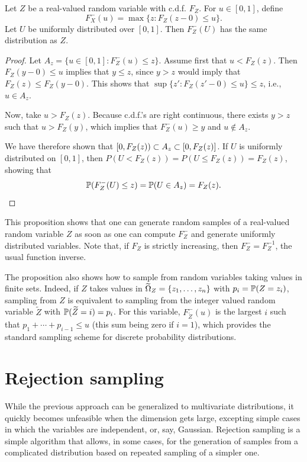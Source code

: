 \begin{proposition}
\label{prop:sampling}
Let $Z$ be a real-valued random variable with c.d.f. $F_Z$.
For  $u\in [0,1]$, define
\[
F_X^-(u) = \max\{z: F_Z(z-0) \leq u\}.
\]
Let $U$ be uniformly distributed over $[0,1]$. Then $F_Z^-(U)$ has the same distribution as $Z$.
\end{proposition}
\begin{proof}
Let $A_z = \{u\in [0,1]: F_Z^-(u) \leq z\}$.  
Assume first that $u<F_Z(z)$. Then $F_Z(y-0) \leq u$ implies that $y\leq z$, since $y>z$ would imply that $F_Z(z) \leq F_Z(y-0)$. This shows that $\sup\{z': F_Z(z'-0) \leq u\} \leq z$, i.e., $u\in A_z$. 

Now, take $u>F_Z(z)$. Because c.d.f.'s are right continuous, there exists $y>z$ such that $u>F_Z(y)$, which implies that $F_Z^-(u) \geq y$ and $u\not \in A_z$. 

We have therefore shown that $[0, F_Z(z)) \subset A_z \subset [0, F_Z(z)]$. 
If $U$ is uniformly distributed on $[0,1]$, then $P(U< F_Z(z)) = P(U \leq F_Z(z)) = F_Z(z)$, showing that
\[
\bm{\mathbb P}(F_Z^-(U) \leq z) = \bm{\mathbb P}(U\in A_z) = F_Z(z).
\]
\end{proof}

This proposition shows that one can generate random samples of a real-valued random variable $Z$ as soon as one can compute $F_Z^-$ and generate uniformly distributed variables. Note that, if $F_Z$ is strictly increasing, then $F_Z^- = F_Z^{-1}$, the usual function inverse.

The proposition also shows how to sample from random variables taking values in finite sets. Indeed, if $Z$ takes values in ${\widetilde{\Omega}}_Z = \{z_1, \ldots, z_n\}$ with $p_i = \bm{\mathbb P}(Z=z_i)$, sampling from $Z$ is equivalent to sampling from the integer valued random variable $\widetilde Z$ with $\bm{\mathbb P}(\widetilde Z = i) = p_i$. For this variable, $F_{\tilde Z}^-(u)$ is the largest $i$ such that $p_1 + \cdots + p_{i-1} \leq u$ (this sum being zero if $i=1$), which provides the standard sampling scheme for discrete probability distributions. 

\section{Rejection sampling}
While the previous approach can be generalized to multivariate distributions, it quickly becomes unfeasible when the dimension gets large, excepting simple cases in which the variables are independent, or, say, Gaussian. Rejection sampling is a simple algorithm that allows, in some cases, for the generation of samples from a complicated distribution based on repeated sampling of  a simpler one. 

